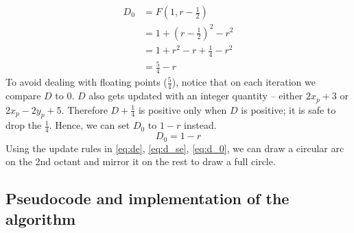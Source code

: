 \documentclass[a4paper]{article}
\begin{document}
\begin{align*}
    D_0 &= F(1, r-\frac{1}{2}) \\
    &= 1 + (r-\frac{1}{2})^2  - r^2 \\
    &= 1+ r^2 - r + \frac{1}{4} - r^2\\
    &= \frac{5}{4} - r  
\end{align*}
To avoid dealing with floating points ($\tfrac{5}{4}$), notice that on each iteration we compare $D$ to 0. $D$ also gets updated with an integer quantity -- either $2x_p+3$ or $2x_p-2y_p+5$. Therefore $D+\tfrac{1}{4}$ is positive only when $D$ is positive; it is safe to drop the $\tfrac{1}{4}$. Hence, we can set $D_0$ to $1-r$ instead.
\begin{equation}
    D_0 = 1-r
    \label{eq:d_0}
\end{equation}
Using the update rules in \eqref{eq:de}, \eqref{eq:d_se}, \eqref{eq:d_0}, we can draw a circular arc on the 2nd octant and mirror it on the rest to draw a full circle.




\subsection{Pseudocode and implementation of the algorithm}
\end{document}
